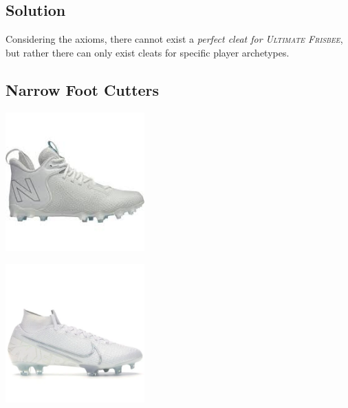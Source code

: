 \documentclass{article}
\begin{document}
\begin{answerbox}
    \section*{Solution}
    Considering the axioms, there cannot exist a \textit{perfect cleat for \textsc{Ultimate Frisbee}}, but rather there can only exist cleats for specific player archetypes.

    \begin{multicols}{3}
    \subsection*{Narrow Foot Cutters}
    \centering
        \begin{minipage}{0.3\textwidth}
            \centering
            \includegraphics[width=0.4\textwidth]{cleat1.png}
        \end{minipage}
        \begin{minipage}{0.3\textwidth}
            \centering
            \includegraphics[width=0.4\textwidth]{cleat4.png}
        \end{minipage}

\end{multicols}
\end{answerbox}
\end{document}
